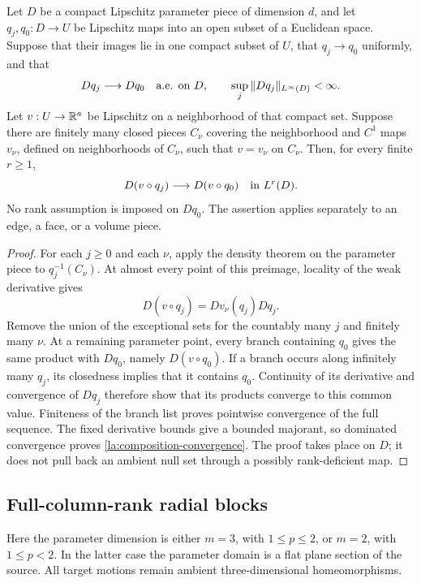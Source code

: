 \begin{lemma}\label{la:composition-limit}
Let $D$ be a compact Lipschitz parameter piece of dimension $d$, and let
$q_j,q_0:D\to U$ be Lipschitz maps into an open subset of a Euclidean
space.  Suppose that their images lie in one compact subset of $U$,
that $q_j\to q_0$ uniformly, and that
\[
 Dq_j\longrightarrow Dq_0\quad\hbox{a.e. on }D,
 \qquad \sup_j\|Dq_j\|_{L^\infty(D)}<\infty.
\]
Let $v:U\to\mathbb R^a$ be Lipschitz on a neighborhood of that compact set.
Suppose there are finitely many closed pieces $C_\nu$ covering the
neighborhood and $C^1$ maps $v_\nu$, defined on neighborhoods of
$C_\nu$, such that $v=v_\nu$ on $C_\nu$.  Then, for every finite
$r\ge1$,
\begin{equation}\label{la:composition-convergence}
 D(v\circ q_j)\longrightarrow D(v\circ q_0)
       \quad\hbox{in }L^r(D).
\end{equation}
No rank assumption is imposed on $Dq_0$.  The assertion applies
separately to an edge, a face, or a volume piece.
\end{lemma}

\begin{proof}
For each $j\ge0$ and each $\nu$, apply the density theorem on the
parameter piece to $q_j^{-1}(C_\nu)$.  At almost every point of this
preimage, locality of the weak derivative gives
\[
 D(v\circ q_j)=Dv_\nu(q_j)Dq_j.
\]
Remove the union of the exceptional sets for the countably many $j$
and finitely many $\nu$.  At a remaining parameter point, every branch
containing $q_0$ gives the same product with $Dq_0$, namely
$D(v\circ q_0)$.  If a branch occurs along infinitely many $q_j$, its
closedness implies that it contains $q_0$.  Continuity of its
derivative and convergence of $Dq_j$ therefore show that its products
converge to this common value.  Finiteness of the branch list proves
pointwise convergence of the full sequence.  The fixed derivative
bounds give a bounded majorant, so dominated convergence proves
\eqref{la:composition-convergence}.  The proof takes place on $D$;
it does not pull back an ambient null set through a possibly
rank-deficient map.
\end{proof}

\subsection{Full-column-rank radial blocks}

Here the parameter dimension is either $m=3$, with $1\le p\le2$, or
$m=2$, with $1\le p<2$.  In the latter case the parameter domain is a
flat plane section of the source.  All target motions remain ambient
three-dimensional homeomorphisms.

